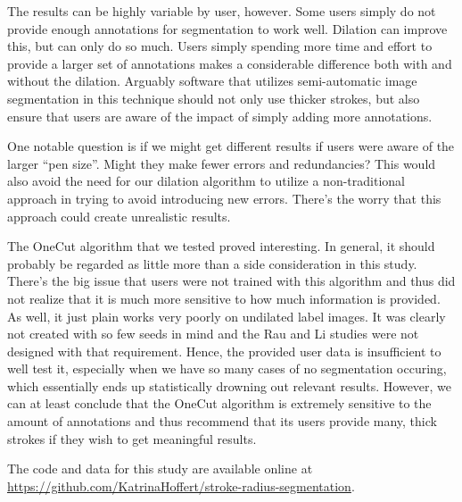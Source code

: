 \documentclass[12pt,a4paper,notitlepage]{article}
\begin{document}
The results can be highly variable by user, however. Some users simply do not provide enough annotations for segmentation to work well. Dilation can improve this, but can only do so much. Users simply spending more time and effort to provide a larger set of annotations makes a considerable difference both with and without the dilation. Arguably software that utilizes semi-automatic image segmentation in this technique should not only use thicker strokes, but also ensure that users are aware of the impact of simply adding more annotations.

One notable question is if we might get different results if users were aware of the larger ``pen size''. Might they make fewer errors and redundancies? This would also avoid the need for our dilation algorithm to utilize a non-traditional approach in trying to avoid introducing new errors. There's the worry that this approach could create unrealistic results.

The OneCut algorithm that we tested proved interesting. In general, it should probably be regarded as little more than a side consideration in this study. There's the big issue that users were not trained with this algorithm and thus did not realize that it is much more sensitive to how much information is provided. As well, it just plain works very poorly on undilated label images. It was clearly not created with so few seeds in mind and the Rau and Li studies were not designed with that requirement. Hence, the provided user data is insufficient to well test it, especially when we have so many cases of no segmentation occuring, which essentially ends up statistically drowning out relevant results. However, we can at least conclude that the OneCut algorithm is extremely sensitive to the amount of annotations and thus recommend that its users provide many, thick strokes if they wish to get meaningful results.

The code and data for this study are available online at \url{https://github.com/KatrinaHoffert/stroke-radius-segmentation}\cite{repo}.



\end{document}

